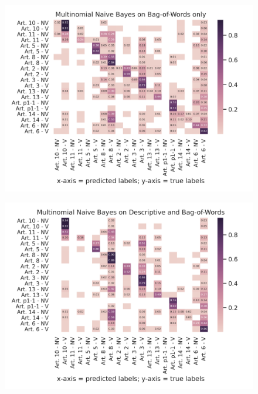 \documentclass{article}
\begin{document}
\begin{figure}[!htb]
    \centering
    \includegraphics[scale=0.7]{data/analysis/cm/multiclass_cm_test_multinomial_naive_bayes_bag-of-words_only.png}  
\end{figure}
\begin{figure}[!htb]
    \centering
    \includegraphics[scale=0.7]{data/analysis/cm/multiclass_cm_test_multinomial_naive_bayes_descriptive_and_bag-of-words.png}  
\end{figure}
\end{document}
